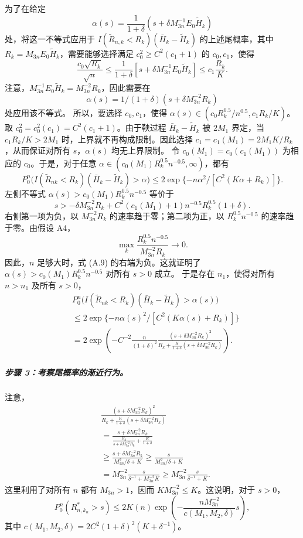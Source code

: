 为了在给定
\[
\alpha(s)=\frac1{1+\delta}(s+\delta M_{3n}^{-1}E_0\widetilde H_k)
\]
处，将这一不等式应用于 $I(\widetilde R_{n,k}<R_k)(\bar H_k-\widetilde H_k)$ 的上述尾概率，其中 $R_k=M_{3n}E_0\widetilde H_k$，需要能够选择满足 $c_0^2\ge C^2(c_1+1)$ 的 $c_0,c_1$，使得
\begin{equation}
\frac{c_0\sqrt{R_k}}{\sqrt n}
 \le\frac1{1+\delta}[s+\delta M_{3n}^{-1}E_0\widetilde H_k]
 \le c_1\frac{R_k}{K}.
\tag{A.8}
\end{equation}
注意，$M_{3n}^{-1}E_0\widetilde H_k=M_{3n}^{-2}R_k$，因此需要在
\[
\alpha(s)=1/(1+\delta)(s+\delta M_{3n}^{-2}R_k)
\]
处应用该不等式。
所以，要选择 $c_0,c_1$，使得
$\alpha(s)\in(c_0R_k^{0.5}/n^{0.5},c_1R_k/K)$。取
$c_0^2=c_0^2(c_1)=C^2(c_1+1)$。由于鞅过程
$\bar H_k-\widetilde H_k$ 被 $2M_1$ 界定，当 $c_1R_k/K>2M_1$ 时，上界就不再构成限制。因此选择
$c_1=c_1(M_1)=2M_1K/R_k$，从而保证对所有 $s$，$\alpha(s)$ 均无上界限制。
令 $c_0(M_1)=c_0(c_1(M_1))$ 为相应的 $c_0$。于是，对于任意
$\alpha\in(c_0(M_1)R_k^{0.5}n^{-0.5},\infty)$，都有
\[
P_0^n\bigl(I(\widetilde R_{nk}<R_k)(\bar H_k-\widetilde H_k)>\alpha\bigr)
 \le2\exp\{-n\alpha^2/[C^2(K\alpha+R_k)]\}.
\]
左侧不等式 $\alpha(s)>c_0(M_1)R_k^{0.5}n^{-0.5}$ 等价于
\begin{equation}
s>-\delta M_{3n}^{-2}R_k
 +C^2(c_1(M_1)+1)n^{-0.5}R_k^{0.5}(1+\delta).
\tag{A.9}
\end{equation}
右侧第一项为负，以 $M_{3n}^{-2}R_k$ 的速率趋于零；第二项为正，以 $R_k^{0.5}n^{-0.5}$ 的速率趋于零。由假设 A4，
\[
\max_k\frac{R_k^{0.5}n^{-0.5}}{M_{3n}^{-2}R_k}\longrightarrow0.
\]
因此，$n$ 足够大时，式 (A.9) 的右端为负。这就证明了
$\alpha(s)>c_0(M_1)R_k^{0.5}n^{-0.5}$ 对所有 $s>0$ 成立。
于是存在 $n_1$，使得对所有 $n>n_1$ 及所有 $s>0$，
\[
\begin{aligned}
&P_0^n\bigl(I(\widetilde R_{nk}<R_k)(\bar H_k-\widetilde H_k)>\alpha(s)\bigr)\\
&\le2\exp\{-n\alpha(s)^2/[C^2(K\alpha(s)+R_k)]\}\\
&=2\exp\left(-C^{-2}\frac n{(1+\delta)^2}
 \frac{(s+\delta M_{3n}^{-2}R_k)^2}
 {R_k+\frac K{1+\delta}(s+\delta M_{3n}^{-2}R_k)}\right).
\end{aligned}
\]

\subparagraph{步骤 3：考察尾概率的渐近行为。}
注意，
\[
\begin{aligned}
&\frac{(s+\delta M_{3n}^{-2}R_k)^2}
 {R_k+\frac K{1+\delta}(s+\delta M_{3n}^{-2}R_k)}\\
&=\frac{s+\delta M_{3n}^{-2}R_k}
 {\frac{R_k}{s+\delta M_{3n}^{-2}R_k}+\frac K{1+\delta}}\\
&\ge\frac{s+\delta M_{3n}^{-2}R_k}{M_{3n}^2/\delta+K}
 \ge\frac s{M_{3n}^2/\delta+K}\\
&=M_{3n}^{-2}\frac s{\delta^{-1}+M_{3n}^{-2}K}
 \ge M_{3n}^{-2}\frac s{\delta^{-1}+K}.
\end{aligned}
\]
这里利用了对所有 $n$ 都有 $M_{3n}>1$，因而 $KM_{3n}^{-2}\le K$。这说明，对于 $s>0$，
\[
P_0^n(R^*_{n,k_n}>s)\le2K(n)
 \exp\left(-\frac{nM_{3n}^{-2}}{c(M_1,M_2,\delta)}s\right),
\]
其中 $c(M_1,M_2,\delta)=2C^2(1+\delta)^2(K+\delta^{-1})$。


